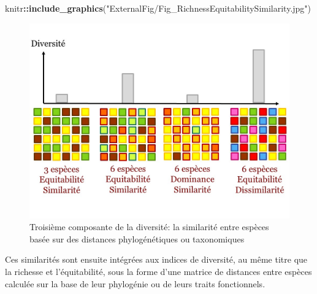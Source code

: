 \documentclass[
  11pt,
  french,
  A4paper,
  extrafontsizes,onecolumn,openright
  ]{memoir}
\newenvironment{Shaded}{\begin{snugshade}}{\end{snugshade}}
\newcommand{\KeywordTok}[1]{\textcolor[rgb]{0.13,0.29,0.53}{\textbf{#1}}}
\newcommand{\StringTok}[1]{\textcolor[rgb]{0.31,0.60,0.02}{#1}}
\newcommand{\OperatorTok}[1]{\textcolor[rgb]{0.81,0.36,0.00}{\textbf{#1}}}
\newcommand{\NormalTok}[1]{#1}
\begin{document}
\begin{Shaded}
\begin{Highlighting}[]
\NormalTok{knitr}\OperatorTok{::}\KeywordTok{include_graphics}\NormalTok{(}\StringTok{"ExternalFig/Fig_RichnessEquitabilitySimilarity.jpg"}\NormalTok{)}
\end{Highlighting}
\end{Shaded}

\begin{figure}

{\centering \includegraphics[width=0.6\linewidth]{ExternalFig/Fig_RichnessEquitabilitySimilarity} 

}

\caption{Troisième composante de la diversité: la similarité entre espèces basée sur des distances phylogénétiques ou taxonomiques}\label{fig:RichEquSim}
\end{figure}

Ces similarités sont ensuite intégrées aux indices de diversité, au même
titre que la richesse et l'équitabilité, sous la forme d'une matrice de
distances entre espèces calculée sur la base de leur phylogénie ou de
leurs traits fonctionnels.
\end{document}

